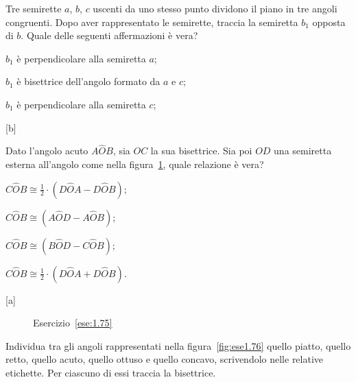 \begin{esercizio}
\label{ese:1.74}
Tre semirette $a$, $b$, $c$ uscenti da uno stesso punto dividono il 
piano in tre angoli congruenti. Dopo aver rappresentato le semirette, 
traccia la semiretta $b_1$ opposta di $b$. Quale delle seguenti 
affermazioni è vera?
\begin{enumeratea}
\item $b_1$ è perpendicolare alla semiretta $a$;
\item $b_1$ è bisettrice dell'angolo formato da $a$ e $c$;
\item $b_1$ è perpendicolare alla semiretta $c$;
\end{enumeratea}
\hfill[b]
\end{esercizio}

\begin{esercizio}
\label{ese:1.75}
Dato l'angolo acuto $A\widehat{O}B$, sia $OC$ la sua bisettrice. Sia 
poi $OD$ una semiretta esterna all'angolo come nella 
figura~\ref{fig:ese1.75}, quale relazione è vera?
\begin{multicols}{2}
\begin{enumeratea}
\item $C\widehat{O}B\cong 
\frac{1}{2}\cdot(D\widehat{O}A-D\widehat{O}B)$;
\item $C\widehat{O}B\cong (A\widehat{O}D-A\widehat{O}B)$;
\item $C\widehat{O}B\cong (B\widehat{O}D-C\widehat{O}B)$;
\item $C\widehat{O}B\cong 
\frac{1}{2}\cdot(D\widehat{O}A+D\widehat{O}B)$.
\end{enumeratea}
\end{multicols}
\hfill[a]
\end{esercizio}


\begin{inaccessibleblock}
 \begin{figure}[htb]
 \centering
 \caption{Esercizio~\ref{ese:1.75}}\label{fig:ese1.75}
\end{figure}
\end{inaccessibleblock}

\begin{esercizio}
\label{ese:1.76}
Individua tra gli angoli rappresentati nella figura~\ref{fig:ese1.76} 
quello piatto, quello retto, quello acuto, quello ottuso e quello 
concavo, scrivendolo nelle relative etichette. Per ciascuno di essi 
traccia la bisettrice.
\end{esercizio}


